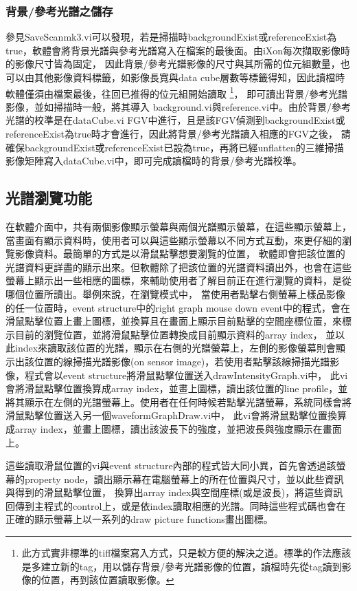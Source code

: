\documentclass[12pt]{article}
\begin{document}
    \subsubsection{背景/參考光譜之儲存}
    參見SaveScan\textunderscore mk3.vi可以發現，若是掃描時backgroundExist或referenceExist為true，軟體會將背景光譜與參考光譜寫入在檔案的最後面。由iXon每次擷取影像時的影像尺寸皆為固定，
    因此背景/參考光譜影像的尺寸與其所需的位元組數量，也可以由其他影像資料標籤，如影像長寬與data cube層數等標籤得知，因此讀檔時軟體僅須由檔案最後，往回已推得的位元組開始讀取
    \footnote{此方式實非標準的tiff檔案寫入方式，只是較方便的解決之道。標準的作法應該是多建立新的tag，用以儲存背景/參考光譜影像的位置，讀檔時先從tag讀到影像的位置，再到該位置讀取影像。}，
    即可讀出背景/參考光譜影像，並如掃描時一般，將其導入
    background.vi與reference.vi中。由於背景/參考光譜的校準是在dataCube.vi FGV中進行，且是該FGV偵測到backgroundExist或referenceExist為true時才會進行，因此將背景/參考光譜讀入相應的FGV之後，
    請確保backgroundExist或referenceExist已設為true，再將已經unflatten的三維掃描影像矩陣寫入dataCube.vi中，即可完成讀檔時的背景/參考光譜校準。
    \subsection{光譜瀏覽功能}
    在軟體介面中，共有兩個影像顯示螢幕與兩個光譜顯示螢幕，在這些顯示螢幕上，當畫面有顯示資料時，使用者可以與這些顯示螢幕以不同方式互動，來更仔細的瀏覽影像資料。最簡單的方式是以滑鼠點擊想要瀏覽的位置，
    軟體即會把該位置的光譜資料更詳盡的顯示出來。但軟體除了把該位置的光譜資料讀出外，也會在這些螢幕上顯示出一些相應的圖標，來輔助使用者了解目前正在進行瀏覽的資料，是從哪個位置所讀出。舉例來說，在瀏覽模式中，
    當使用者點擊右側螢幕上樣品影像的任一位置時，event structure中的right graph mouse down event中的程式，會在滑鼠點擊位置上畫上圖標，並換算且在畫面上顯示目前點擊的空間座標位置，來標示目前的瀏覽位置，並將滑鼠點擊位置轉換成目前顯示資料的array index，
    並以此index來讀取該位置的光譜，顯示在右側的光譜螢幕上，左側的影像螢幕則會顯示出該位置的線掃描光譜影像(on sensor image)，若使用者點擊該線掃描光譜影像，程式會以event structure將滑鼠點擊位置送入drawIntensityGraph.vi中，
    此vi會將滑鼠點擊位置換算成array index，並畫上圖標，讀出該位置的line profile，並將其顯示在左側的光譜螢幕上。使用者在任何時候若點擊光譜螢幕，系統同樣會將滑鼠點擊位置送入另一個waveformGraphDraw.vi中，
    此vi會將滑鼠點擊位置換算成array index，並畫上圖標，讀出該波長下的強度，並把波長與強度顯示在畫面上。

    這些讀取滑鼠位置的vi與event structure內部的程式皆大同小異，首先會透過該螢幕的property node，讀出顯示幕在電腦螢幕上的所在位置與尺寸，並以此些資訊與得到的滑鼠點擊位置，
    換算出array index與空間座標(或是波長)，將這些資訊回傳到主程式的control上，或是依index讀取相應的光譜。同時這些程式碼也會在正確的顯示螢幕上以一系列的draw picture functions畫出圖標。
\end{document}
